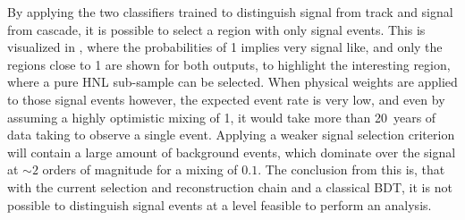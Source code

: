 

By applying the two classifiers trained to distinguish signal from track and signal from cascade, it is possible to select a region with only signal events. This is visualized in , where the probabilities of 1 implies very signal like, and only the regions close to 1 are shown for both outputs, to highlight the interesting region, where a pure HNL sub-sample can be selected. When physical weights are applied to those signal events however, the expected event rate is very low, and even by assuming a highly optimistic mixing of 1, it would take more than \SI{20}{years} of data taking to observe a single event. Applying a weaker signal selection criterion will contain a large amount of background events, which dominate over the signal at $\sim2$ orders of magnitude for a mixing of $0.1$. The conclusion from this is, that with the current selection and reconstruction chain and a classical BDT, it is not possible to distinguish signal events at a level feasible to perform an analysis.

